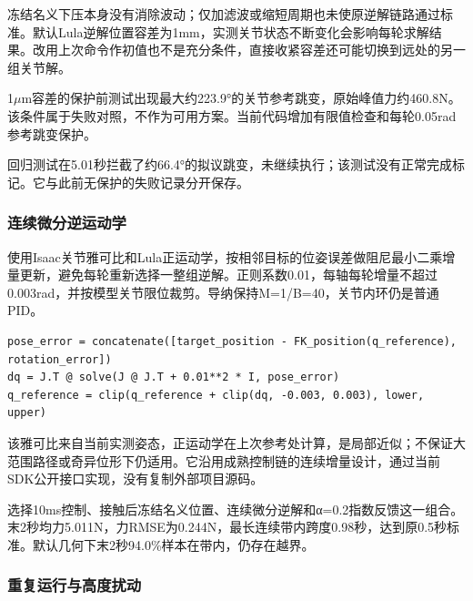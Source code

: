 冻结名义下压本身没有消除波动；仅加滤波或缩短周期也未使原逆解链路通过标准。默认Lula逆解位置容差为1mm，实测关节状态不断变化会影响每轮求解结果。改用上次命令作初值也不是充分条件，直接收紧容差还可能切换到远处的另一组关节解。

1\(\mu\)m容差的保护前测试出现最大约223.9°的关节参考跳变，原始峰值力约460.8N。该条件属于失败对照，不作为可用方案。当前代码增加有限值检查和每轮0.05rad参考跳变保护。

回归测试在5.01秒拦截了约66.4°的拟议跳变，未继续执行；该测试没有正常完成标记。它与此前无保护的失败记录分开保存。


\subsubsection{连续微分逆运动学}\label{s12-detail-4}

使用Isaac关节雅可比和Lula正运动学，按相邻目标的位姿误差做阻尼最小二乘增量更新，避免每轮重新选择一整组逆解。正则系数0.01，每轴每轮增量不超过0.003rad，并按模型关节限位裁剪。导纳保持M=1/B=40，关节内环仍是普通PID。

\begin{Verbatim}[breaklines=true,breakanywhere=true,fontsize=\footnotesize]
pose_error = concatenate([target_position - FK_position(q_reference), rotation_error])
dq = J.T @ solve(J @ J.T + 0.01**2 * I, pose_error)
q_reference = clip(q_reference + clip(dq, -0.003, 0.003), lower, upper)
\end{Verbatim}

该雅可比来自当前实测姿态，正运动学在上次参考处计算，是局部近似；不保证大范围路径或奇异位形下仍适用。它沿用成熟控制链的连续增量设计，通过当前SDK公开接口实现，没有复制外部项目源码。


选择10ms控制、接触后冻结名义位置、连续微分逆解和α=0.2指数反馈这一组合。末2秒均力5.011N，力RMSE为0.244N，最长连续带内跨度0.98秒，达到原0.5秒标准。默认几何下末2秒94.0\%样本在带内，仍存在越界。

\subsubsection{重复运行与高度扰动}\label{s12-detail-5}

